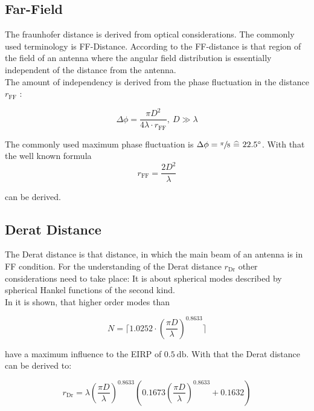 \subsection{Far-Field}

The fraunhofer distance is derived from optical considerations. The commonly used terminology is \acf{FF}-Distance. According to \cite{balanis} the \ac{FF}-distance is \glqq that region of the field of an antenna where the angular field distribution is essentially independent of the distance from the antenna.\grqq \\
The amount of independency is derived from the phase fluctuation in the distance $r_{\text{FF}}$ \cite{19510}:

\begin{equation}
\Delta\phi = \frac{\pi D^2}{4\lambda\cdot r_{\text{FF}}} ,\ D\gg\lambda 
\end{equation}

The commonly used maximum phase fluctuation is $\Delta\phi = \sfrac{\pi}{8} \ \widehat{=}\  22.5^\circ$. With that the well known formula
\begin{equation}
r_{\text{FF}} = \frac{2D^2}{\lambda}
\end{equation}

can be derived.

\subsection{Derat Distance}

The Derat distance is that distance, in which the main beam of an antenna is in \ac{FF} condition. For the understanding of the Derat distance $r_{\text{Dr}}$ other considerations need to take place: It is about spherical modes described by spherical Hankel functions  of the second kind. \cite{8393926} \cite{hansen}\\
In \cite{8393926} it is shown, that higher order modes than 

\begin{equation}
N = \lceil 1.0252\cdot\left(\frac{\pi D}{\lambda}\right)^{0.8633} \rceil
\end{equation}

have a maximum influence to the \ac{EIRP} of $\SI{0.5}{\decibel}$. With that the Derat distance can be derived to:

\begin{equation}
r_{\text{Dr}} = \lambda\left(\frac{\pi D}{\lambda}\right)^{0.8633}\left(0.1673\left(\frac{\pi D}{\lambda}\right)^{0.8633}+0.1632\right)
\end{equation}

